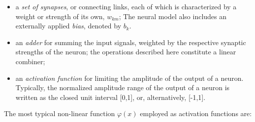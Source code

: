\begin{itemize}
\item a \textit{set of synapses}, or connecting links, each of which is characterized by a weight or strength of its own, $w_{km}$; The neural model also includes an externally applied \textit{bias}, denoted by $b_k$.
\item an \textit{adder} for summing the input signals, weighted by the respective synaptic strengths of the neuron; the operations described here constitute a linear combiner;
\item an \textit{activation function} for limiting the amplitude of the output of a neuron. Typically, the normalized amplitude range of the output of a neuron is written as the closed unit interval [0,1], or, alternatively, [-1,1].
\end{itemize}
The most typical non-linear function $\varphi(x)$ employed as activation functions are:
